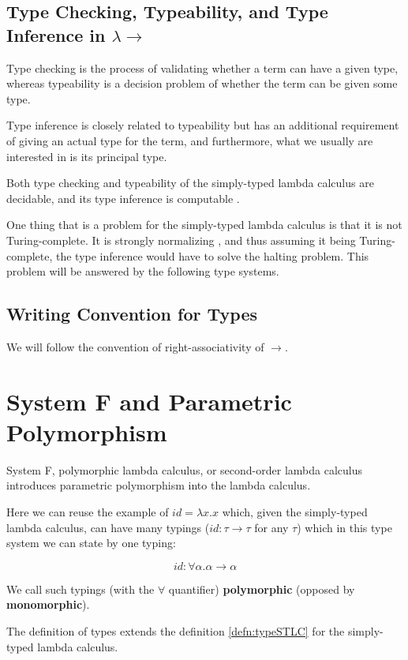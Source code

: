 \subsection{Type Checking, Typeability, and Type Inference in $\lambda\rightarrow$}

Type checking is the process of validating whether a term can have a given type, whereas typeability is a decision problem of whether the term can be given some type.

Type inference is closely related to typeability but has an additional requirement of giving an actual type for the term, and furthermore, what we usually are interested in is its principal type.

Both type checking and typeability of the simply-typed lambda calculus are decidable, and its type inference is computable \cite{barendregt1992lambda}.

One thing that is a problem for the simply-typed lambda calculus is that it is not Turing-complete. It is strongly normalizing \cite{barendregt1992lambda}, and thus assuming it being Turing-complete, the type inference would have to solve the halting problem. This problem will be answered by the following type systems.

\subsection{Writing Convention for Types}

We will follow the convention of right-associativity of $\rightarrow$.

\section{System F and Parametric Polymorphism}

System F, polymorphic lambda calculus, or second-order lambda calculus introduces parametric polymorphism into the lambda calculus.

Here we can reuse the example of $id = \lambda x . x$ which, given the simply-typed lambda calculus, can have many typings ($id : \tau \rightarrow \tau$ for any $\tau$) which in this type system we can state by one typing:

$$id : \forall \alpha . \alpha \rightarrow \alpha$$

We call such typings (with the $\forall$ quantifier) \textbf{polymorphic} (opposed by \textbf{monomorphic}).

The definition of types extends the definition \ref{defn:typeSTLC} for the simply-typed lambda calculus.

